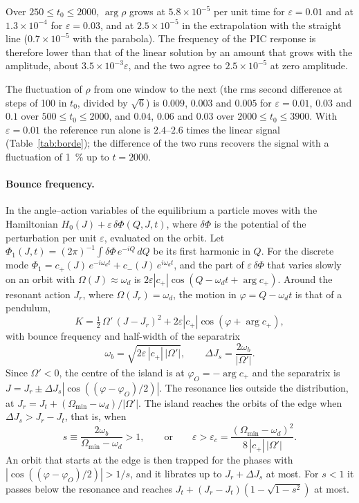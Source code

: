 \documentclass[11pt,a4paper]{article}
\begin{document}
Over $250\le t_0\le2000$, $\arg\rho$ grows at $5.8\times10^{-5}$ per unit time for $\varepsilon=0.01$
and at $1.3\times10^{-4}$ for $\varepsilon=0.03$, and at $2.5\times10^{-5}$ in the extrapolation with
the straight line ($0.7\times10^{-5}$ with the parabola). The frequency of the PIC response is
therefore lower than that of the linear solution by an amount that grows with the amplitude,
about $3.5\times10^{-3}\varepsilon$, and the two agree to $2.5\times10^{-5}$ at zero amplitude.

The fluctuation of $\rho$ from one window to the next (the rms second difference at steps of
100 in $t_0$, divided by $\sqrt6$) is $0.009$, $0.003$ and $0.005$ for $\varepsilon=0.01$, $0.03$ and
$0.1$ over $500\le t_0\le2000$, and $0.04$, $0.06$ and $0.03$ over $2000\le t_0\le3900$. With
$\varepsilon=0.01$ the reference run alone is $2.4$--$2.6$ times the linear signal
(Table~\ref{tab:borde}); the difference of the two runs recovers the signal with a fluctuation
of \SI{1}{\%} up to $t=2000$.

\paragraph{Bounce frequency.} In the angle--action variables of the equilibrium a particle
moves with the Hamiltonian $H_0(J)+\varepsilon\,\delta\Phi(Q,J,t)$, where $\delta\Phi$ is the
potential of the perturbation per unit $\varepsilon$, evaluated on the orbit. Let
$\Phi_1(J,t)=(2\pi)^{-1}\int\delta\Phi\,e^{-iQ}\,dQ$ be its first harmonic in $Q$. For the discrete
mode $\Phi_1=c_+(J)\,e^{-i\omega_dt}+c_-(J)\,e^{i\omega_dt}$, and the part of $\varepsilon\,\delta\Phi$ that
varies slowly on an orbit with $\Omega(J)\approx\omega_d$ is
$2\varepsilon|c_+|\cos(Q-\omega_dt+\arg c_+)$. Around the resonant action $J_r$, where
$\Omega(J_r)=\omega_d$, the motion in $\varphi=Q-\omega_dt$ is that of a pendulum,
\[
  K=\tfrac12\,\Omega'\,(J-J_r)^2+2\varepsilon|c_+|\cos(\varphi+\arg c_+),
\]
with bounce frequency and half-width of the separatrix
\[
  \omega_b=\sqrt{2\varepsilon\,|c_+|\,|\Omega'|},\qquad \Delta J_s=\frac{2\omega_b}{|\Omega'|}.
\]
Since $\Omega'<0$, the centre of the island is at $\varphi_O=-\arg c_+$ and the separatrix is
$J=J_r\pm\Delta J_s|\cos((\varphi-\varphi_O)/2)|$. The resonance lies outside the distribution, at
$J_r=J_t+(\Omega_{\min}-\omega_d)/|\Omega'|$. The island reaches the orbits of the edge when
$\Delta J_s>J_r-J_t$, that is, when
\[
  s\equiv\frac{2\omega_b}{\Omega_{\min}-\omega_d}>1,\qquad\text{or}\qquad
  \varepsilon>\varepsilon_c=\frac{(\Omega_{\min}-\omega_d)^2}{8\,|c_+|\,|\Omega'|}.
\]
An orbit that starts at the edge is then trapped for the phases with
$|\cos((\varphi-\varphi_O)/2)|>1/s$, and it librates up to $J_r+\Delta J_s$ at most. For $s<1$ it
passes below the resonance and reaches $J_t+(J_r-J_t)(1-\sqrt{1-s^2})$ at most.
\end{document}
